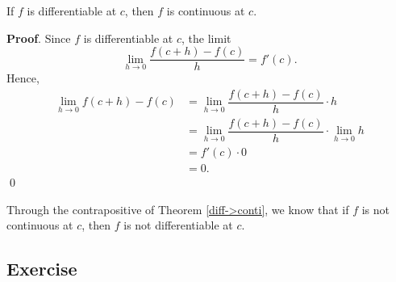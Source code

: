 \documentclass[11pt]{book}
\theoremstyle{break}
\theoremstyle{no_label}
\numberwithin{equation}{section}
\begin{document}
\begin{theorem}\label{diff->conti}
    If $f$ is differentiable at $c$, then $f$ is continuous at $c$.
\end{theorem}
\textbf{Proof}. Since $f$ is differentiable at $c$, the limit $$\lim_{h\to 0}\dfrac{f(c+h)-f(c)}{h}=f'(c).$$ Hence, \begin{align*}
    \lim_{h\to 0}f(c+h)-f(c)&=\lim_{h\to 0}\dfrac{f(c+h)-f(c)}{h}\cdot h\\
    &=\lim_{h\to 0}\dfrac{f(c+h)-f(c)}{h}\cdot \lim_{h\to 0} h\\
    &=f'(c)\cdot 0\\
    &=0.
\end{align*} \qed

\begin{remark}
    Through the contrapositive of Theorem \ref{diff->conti}, we know that if $f$ is not continuous at $c$, then $f$ is not differentiable at $c$.
\end{remark}

\subsection*{Exercise}
\end{document}
